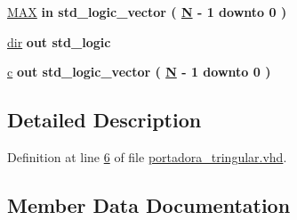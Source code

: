 \begin{DoxyCompactItemize}
\item 
\hyperlink{classportadora__tringular_a06de1330d80ce7a764361167217baf42}{M\+A\+X}  {\bfseries {\bfseries \textcolor{keywordflow}{in}\textcolor{vhdlchar}{ }}} {\bfseries \textcolor{comment}{std\+\_\+logic\+\_\+vector}\textcolor{vhdlchar}{ }\textcolor{vhdlchar}{(}\textcolor{vhdlchar}{ }\textcolor{vhdlchar}{ }\textcolor{vhdlchar}{ }\textcolor{vhdlchar}{ }{\bfseries \hyperlink{classportadora__tringular_af8ee6f7e8fea0e211d86d8e3fd6f8d29}{N}} \textcolor{vhdlchar}{-\/}\textcolor{vhdlchar}{ } \textcolor{vhdldigit}{1} \textcolor{vhdlchar}{ }\textcolor{keywordflow}{downto}\textcolor{vhdlchar}{ }\textcolor{vhdlchar}{ } \textcolor{vhdldigit}{0} \textcolor{vhdlchar}{ }\textcolor{vhdlchar}{)}\textcolor{vhdlchar}{ }} 
\item 
\hyperlink{classportadora__tringular_a8fb21bca6cb529fd30fa4b1f8b156237}{dir}  {\bfseries {\bfseries \textcolor{keywordflow}{out}\textcolor{vhdlchar}{ }}} {\bfseries \textcolor{comment}{std\+\_\+logic}\textcolor{vhdlchar}{ }} 
\item 
\hyperlink{classportadora__tringular_a54ed3cc1c7433faf63dbf6b009fe8137}{c}  {\bfseries {\bfseries \textcolor{keywordflow}{out}\textcolor{vhdlchar}{ }}} {\bfseries \textcolor{comment}{std\+\_\+logic\+\_\+vector}\textcolor{vhdlchar}{ }\textcolor{vhdlchar}{(}\textcolor{vhdlchar}{ }\textcolor{vhdlchar}{ }\textcolor{vhdlchar}{ }\textcolor{vhdlchar}{ }{\bfseries \hyperlink{classportadora__tringular_af8ee6f7e8fea0e211d86d8e3fd6f8d29}{N}} \textcolor{vhdlchar}{-\/}\textcolor{vhdlchar}{ } \textcolor{vhdldigit}{1} \textcolor{vhdlchar}{ }\textcolor{keywordflow}{downto}\textcolor{vhdlchar}{ }\textcolor{vhdlchar}{ } \textcolor{vhdldigit}{0} \textcolor{vhdlchar}{ }\textcolor{vhdlchar}{)}\textcolor{vhdlchar}{ }} 
\end{DoxyCompactItemize}


\subsection{Detailed Description}


Definition at line \hyperlink{portadora__tringular_8vhd_source_l00006}{6} of file \hyperlink{portadora__tringular_8vhd_source}{portadora\+\_\+tringular.\+vhd}.



\subsection{Member Data Documentation}
\hypertarget{classportadora__tringular_a54ed3cc1c7433faf63dbf6b009fe8137}{}
